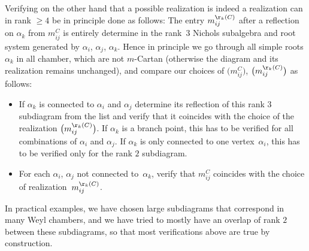 \documentclass[pdftex]{sigma}%
\numberwithin{equation}{section}
\begin{document}
Verifying on the other hand that a possible realization is indeed a realization can in rank $\geq 4$ be in principle done as follows: The entry $m_{ij}^{\r_k(C)}$ after a reflection on $\alpha_k$ from $m_{ij}^C$ is entirely determine in the rank~$3$ Nichols subalgebra and root system generated by $\alpha_i$, $\alpha_j$, $\alpha_k$. Hence in principle we go through all simple roots $\alpha_k$ in all chamber, which are not $m$-Cartan (otherwise the diagram and its realization remains unchanged), and compare our choices of $\big(m_{ij}^{C}\big)$, $\big(m_{ij}^{\r_k(C)}\big)$ as follows:
\begin{itemize}\itemsep=0pt
	\item If $\alpha_k$ is connected to $\alpha_i$ and $\alpha_j$ determine its reflection of this rank $3$ subdiagram from the list and verify that it coincides with the choice of the realization $\big(m_{ij}^{\r_k(C)}\big)$. If $\alpha_k$ is a branch point, this has to be verified for all combinations of $\alpha_i$ and $\alpha_j$. If $\alpha_k$ is only connected to one vertex~$\alpha_i$, this has to be verified only for the rank $2$ subdiagram.
	\item For each $\alpha_i$, $\alpha_j$ not connected to~$\alpha_k$, verify that $m_{ij}^{C}$ coincides with the choice of realization~$m_{ij}^{\r_k(C)}$.
\end{itemize}
In practical examples, we have chosen large subdiagrams that correspond in many Weyl chambers, and we have tried to mostly have an overlap of rank $2$ between these subdiagrams, so that most verifications above are true by construction.
\end{document}
